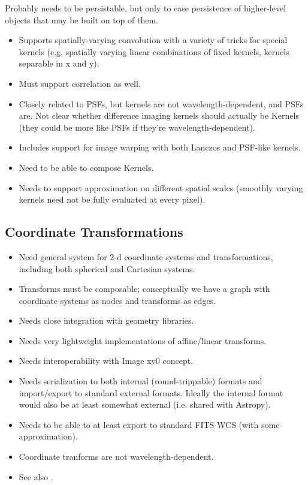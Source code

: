 Probably needs to be persistable, but only to ease persistence of higher-level objects that may be built on top of them.

\begin{itemize}
\item Supports spatially-varying convolution with a variety of tricks for special kernels (e.g. spatially varying linear combinations of fixed kernels, kernels separable in x and y).
\item Must support correlation as well.
\item Closely related to PSFs, but kernels are not wavelength-dependent, and PSFs are.  Not clear whether difference imaging kernels should actually be Kernels (they could be more like PSFs if they're wavelength-dependent).
\item Includes support for image warping with both Lanczos and PSF-like kernels.
\item Need to be able to compose Kernels.
\item Needs to support approximation on different spatial scales (smoothly varying kernels need not be fully evaluated at every pixel).
\end{itemize}

\subsection{Coordinate Transformations}
\label{sec:spWCS}

\begin{itemize}
\item Need general system for 2-d coordinate systems and transformations, including both spherical and Cartesian systems.
\item Transforms must be composable; conceptually we have a graph with coordinate systems as nodes and transforms as edges.
\item Needs close integration with geometry libraries.
\item Needs very lightweight implementations of affine/linear transforms.
\item Needs interoperability with Image xy0 concept.
\item Needs serialization to both internal (round-trippable) formats and import/export to standard external formats.  Ideally the internal format would also be at least somewhat external (i.e. shared with Astropy).
\item Needs to be able to at least export to standard FITS WCS (with some approximation).
\item Coordinate tranforms are not wavelength-dependent.
\item See also .
\end{itemize}


